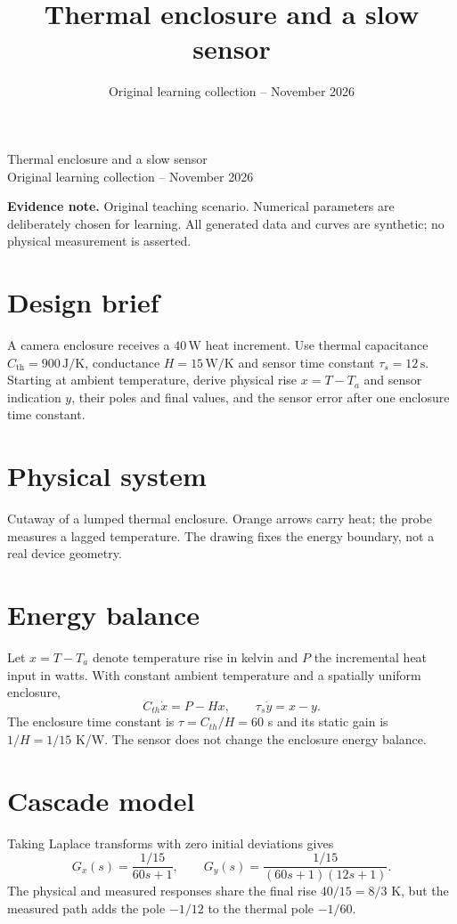 \documentclass[10pt,a4paper]{article}
\title{\color{ink}Thermal enclosure and a slow sensor}
\author{}
\date{Original learning collection -- November 2026}
\begin{document}
\begin{center}{\LARGE\color{ink}Thermal enclosure and a slow sensor}\\[5pt]{\small Original learning collection -- November 2026}\end{center}

\textbf{Evidence note.} Original teaching scenario. Numerical parameters are deliberately chosen for learning. All generated data and curves are synthetic; no physical measurement is asserted.
\section{Design brief}
A camera enclosure receives a $40\,\mathrm{W}$ heat increment. Use thermal capacitance $C_{\mathrm{th}}=900\,\mathrm{J/K}$, conductance $H=15\,\mathrm{W/K}$ and sensor time constant $\tau_s=12\,\mathrm{s}$. Starting at ambient temperature, derive physical rise $x=T-T_a$ and sensor indication $y$, their poles and final values, and the sensor error after one enclosure time constant.
\section{Physical system}
\begin{center}\resizebox{.88\linewidth}{!}{}\par{\small Cutaway of a lumped thermal enclosure. Orange arrows carry heat; the probe measures a lagged temperature. The drawing fixes the energy boundary, not a real device geometry.}\end{center}
\section{Energy balance}
Let $x=T-T_a$ denote temperature rise in kelvin and $P$ the incremental heat input in watts. With constant ambient temperature and a spatially uniform enclosure,
\[C_{th}\dot x=P-Hx,\qquad \tau_s\dot y=x-y.\]
The enclosure time constant is $\tau=C_{th}/H=60$ s and its static gain is $1/H=1/15$ K/W. The sensor does not change the enclosure energy balance.
\section{Cascade model}
Taking Laplace transforms with zero initial deviations gives
\[G_x(s)=\frac{1/15}{60s+1},\qquad G_y(s)=\frac{1/15}{(60s+1)(12s+1)}.\]
The physical and measured responses share the final rise $40/15=8/3$ K, but the measured path adds the pole $-1/12$ to the thermal pole $-1/60$.
\end{document}
